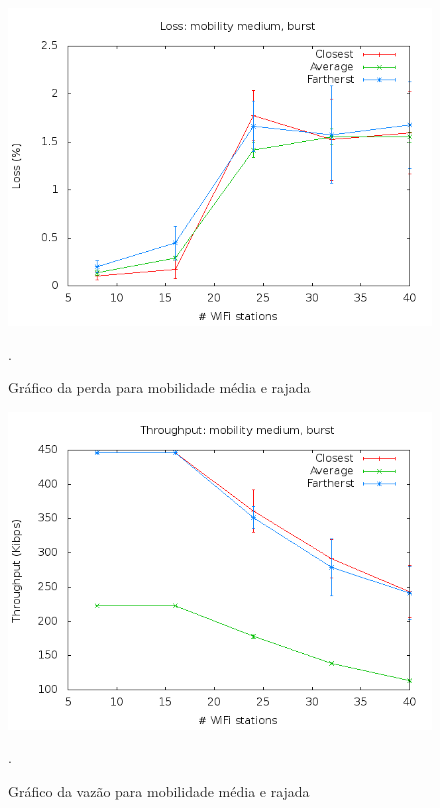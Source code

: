 \documentclass[12pt,twoside,a4paper]{article}
\begin{document}
\begin{figure}[H]
\centering
\includegraphics[scale=0.5]{mo818-loss-mob-1-traf-1}
\caption{Gráfico da perda para mobilidade média e rajada}.
\label{fig:perda-m1-t1}
\end{figure}

\begin{figure}[H]
\centering
\includegraphics[scale=0.5]{mo818-throughput-mob-1-traf-1}
\caption{Gráfico da vazão para mobilidade média e rajada}.
\label{fig:vazao-m1-t1}
\end{figure}
\end{document}
